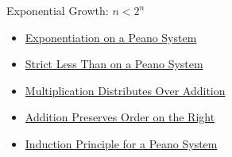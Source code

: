 \begin{topicbox}{Exponential Growth: $n < 2^n$}
\begin{dependencies}
\begin{itemize}
  \item \hyperref[def:exponentiation-on-peano-system]{Exponentiation on a Peano System}
  \item \hyperref[def:strict-less-than-on-peano-system]{Strict Less Than on a Peano System}
  \item \hyperref[thm:multiplication-distributes-over-addition]{Multiplication Distributes Over Addition}
  \item \hyperref[thm:addition-preserves-order-on-right]{Addition Preserves Order on the Right}
  \item \hyperref[thm:induction-principle-for-peano-system]{Induction Principle for a Peano System}
\end{itemize}
\end{dependencies}
\end{topicbox}
